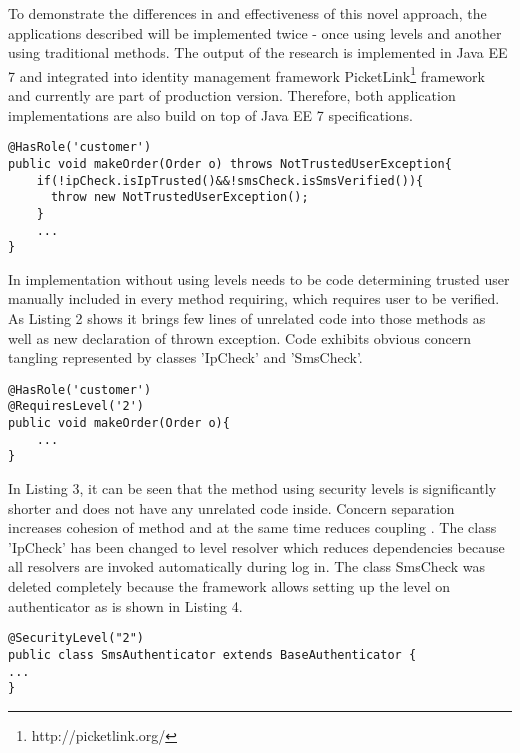 \documentclass{sig-alternate}
\begin{document}
To demonstrate the differences in and effectiveness of this novel approach, the applications described will be implemented twice - once using levels and another using traditional methods. The output of the research is implemented in Java EE 7 and integrated into identity management framework PicketLink\footnote{http://picketlink.org/} framework and currently are part of production version. Therefore, both application implementations are also build on top of Java EE 7 specifications.


\begin{lstlisting}[]
@HasRole('customer')
public void makeOrder(Order o) throws NotTrustedUserException{
    if(!ipCheck.isIpTrusted()&&!smsCheck.isSmsVerified()){
      throw new NotTrustedUserException();
    }
    ...
}          
\end{lstlisting}

In implementation without using levels needs to be code determining trusted user manually included in every method requiring, which requires user to be verified. As Listing 2 shows it brings few lines of unrelated code into those methods as well as new declaration of thrown exception. Code exhibits obvious concern tangling \cite{concernSeparation} represented by classes 'IpCheck' and 'SmsCheck'.

\begin{lstlisting}[]
@HasRole('customer')
@RequiresLevel('2')
public void makeOrder(Order o){
    ...
}          
\end{lstlisting}

In Listing 3, it can be seen that the method using security levels is significantly shorter and does not have any unrelated code inside. Concern separation \cite{concernSeparation} increases cohesion \cite{cohesionCoupling} of method and at the same time reduces coupling \cite{cohesionCoupling}. The class 'IpCheck' has been changed to level resolver which reduces dependencies because all resolvers are invoked automatically during log in. The class SmsCheck was deleted completely because the framework allows setting up the level on authenticator as is shown in Listing 4.

\begin{lstlisting}[]
@SecurityLevel("2")
public class SmsAuthenticator extends BaseAuthenticator {
...
}
\end{lstlisting}
\end{document}
